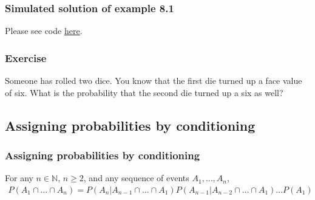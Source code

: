 \begin{frame}[fragile]
    \frametitle{Simulated solution of example 8.1}

    Please see code \href{https://joacorapela.github.io/gcnuBridging2023/auto_examples/foundations/plot_example8_1.html#sphx-glr-auto-examples-foundations-plot-example8-1-py}{here}.

\end{frame}

\begin{frame}
    \frametitle{Exercise}

    Someone has rolled two dice. You know that the first die turned up a
face value of six. What is the probability that the second die turned up a six
as  well?

\end{frame}

\subsection{Assigning probabilities by conditioning}

\begin{frame}
    \frametitle{Assigning probabilities by conditioning}

    \scriptsize
    \begin{probRule}

        For any $n\in\mathbb{N}$, $n\ge 2$, and any sequence of events $A_1,\ldots,A_n$,
            \begin{align*}
                P(A_1\cap\ldots\cap A_n) = P(A_n|A_{n-1}\cap\ldots\cap A_1)
                P(A_{n-1}|A_{n-2}\cap\ldots\cap A_1)\ldots P(A_1)
            \end{align*}
    \end{probRule}

\end{frame}

